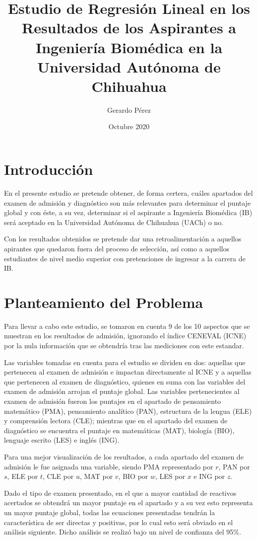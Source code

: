 \documentclass{article}
\title{Estudio de Regresión Lineal en los Resultados de los Aspirantes a Ingeniería Biomédica en la Universidad Autónoma de Chihuahua}
\author{Gerardo Pérez}
\date{Octubre 2020}
\begin{document}
\maketitle

\section{Introducción}

En el presente estudio se pretende obtener, de forma certera, cuáles apartados del examen de admisión y diagnóstico son más relevantes para determinar el puntaje global y con éste, a su vez, determinar si el aspirante a Ingeniería Biomédica (IB) será aceptado en la Universidad Autónoma de Chihuahua (UACh) o no.

Con los resultados obtenidos se pretende dar una retroalimentación a aquellos apirantes que quedaron fuera del proceso de selección, así como a aquellos estudiantes de nivel medio superior con pretenciones de ingresar a la carrera de IB.


\section{Planteamiento del Problema}

Para llevar a cabo este estudio, se tomaron en cuenta 9 de los 10 aspectos que se muestran en los resultados de admisión, ignorando el índice CENEVAL (ICNE) por la nula información que se obtendría tras las mediciones con este estandar.

Las variables tomadas en cuenta para el estudio se dividen en dos: aquellas que pertenecen al examen de admisión e impactan directamente al ICNE y a aquellas que pertenecen al examen de diagnóstico, quienes en suma con las variables del examen de admisión arrojan el puntaje global. Las variables pertenecientes al examen de admisión fueron los puntajes en el apartado de pensamiento matemático (PMA), pensamiento analítico (PAN), estructura de la lengua (ELE) y comprensión lectora (CLE); mientras que en el apartado del examen de diagnóstico se encuentra el puntaje en matemáticas (MAT), biología (BIO), lenguaje escrito (LES) e inglés (ING).

Para una mejor visualización de los resultados, a cada apartado del examen de admisión le fue asignada una variable, siendo PMA representado por $r$, PAN por $s$, ELE por $t$, CLE por $u$, MAT por $v$, BIO por $w$, LES por $x$ e ING por $z$.

Dado el tipo de examen presentado, en el que a mayor cantidad de reactivos acertados se obtendrá un mayor puntaje en el apartado y a su vez esto representa un mayor puntaje global, todas las ecuaciones presentadas tendrán la característica de ser directas y positivas, por lo cual esto será obviado en el análisis siguiente. Dicho análisis se realizó bajo un nivel de confianza del 95\%.
\end{document}
